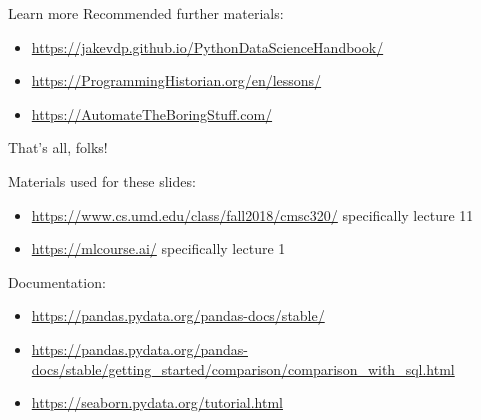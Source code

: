 \documentclass[aspectratio=169,usenames,dvipsnames]{beamer}
\begin{document}
\begin{frame}{Learn more}
    Recommended further materials:
    \vspace{1em}
    \begin{itemize}
        \item \url{https://jakevdp.github.io/PythonDataScienceHandbook/}
        \item \url{https://ProgrammingHistorian.org/en/lessons/}
        \item \url{https://AutomateTheBoringStuff.com/}
    \end{itemize}
\end{frame}

\begin{frame}\Huge\centering
    That's all, folks!
\end{frame}

\begin{frame}
Materials used for these slides:
\begin{itemize}
\item \url{https://www.cs.umd.edu/class/fall2018/cmsc320/}
    specifically lecture 11
\item \url{https://mlcourse.ai/}
    specifically lecture 1
\end{itemize}

\vspace{1em}
Documentation:
\begin{itemize}
    \item \url{https://pandas.pydata.org/pandas-docs/stable/}
    \item \url{https://pandas.pydata.org/pandas-docs/stable/getting_started/comparison/comparison_with_sql.html}
    \item \url{https://seaborn.pydata.org/tutorial.html}
\end{itemize}
\end{frame}
\end{document}

